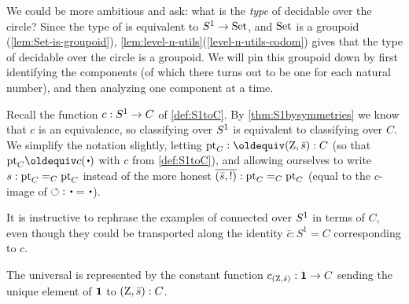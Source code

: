 We could be more ambitious and ask: what is the \emph{type} of decidable 
\coverings over the circle?  Since the type of \coverings is 
equivalent to ${S^1}\to \mathord{\mathrm{Set}}$, and $\mathord{\mathrm{Set}}$ is a groupoid
(\cref{lem:Set-is-groupoid}),
\cref{lem:level-n-utils}(\ref{level-n-utils-codom}) gives
that the type of decidable \coverings over the circle is a groupoid.  
We will pin this groupoid down by first identifying the components 
(of which there turns out to be one for each natural number), 
and then analyzing one component at a time.

Recall the function $c:{S^1}\to C$ of \cref{def:S1toC}. 
By \cref{thm:S1bysymmetries} we know that $c$ is an equivalence, 
so classifying \coverings over ${S^1}$ is equivalent to 
classifying \coverings over $C$.  
We simplify the notation slightly, letting $\pt_C\defeq(\zet,\etop{s}):C$ 
(so that $\pt_C \jdeq c(\base)$ with $c$ from \cref{def:S1toC}), 
and allowing ourselves to write $s:{\mathord{\mathrm{pt}}}_C=_C{\mathord{\mathrm{pt}}}_C$ instead of the 
more honest $\overline{({\bar {s}},{!})}:{\mathord{\mathrm{pt}}}_C=_C{\mathord{\mathrm{pt}}}_C$ 
(equal to the $c$-image of ${\Sloop}:\base=\base$).

It is instructive to rephrase the examples of connected \coverings over ${S^1}$ in 
terms of $C$, even though they could be transported along the identity $\bar c:S^1=C$ corresponding to $c$.

\begin{example}\label{exa:univCcover}
The universal \covering is represented by the constant function
$c_{(\mathrm{Z},\bar {s})}:\mathbf{1}\to C$ sending the unique element 
of $\mathbf{1}$ to $(\mathrm{Z},\bar {s}):C$.
\end{example}

